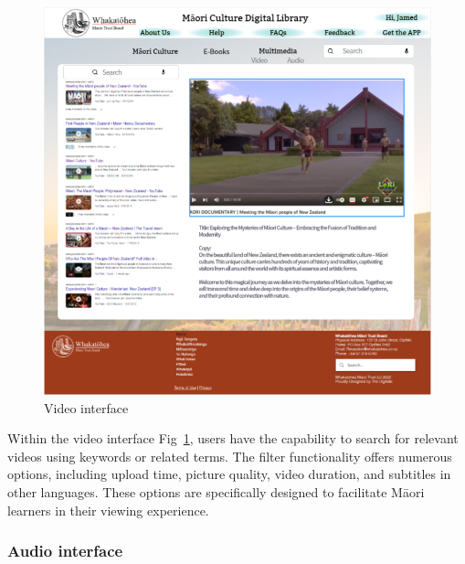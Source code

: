\begin{figure}[htbp]
  \centerline{\includegraphics[width=400pt]{images/3-3-1.png}}
  \caption{Video interface}
  \label{fig3.3.1}
\end{figure}

Within the video interface Fig~\ref{fig3.3.1}, users have the capability to search for relevant videos using keywords or related terms. The filter functionality offers numerous options, including upload time, picture quality, video duration, and subtitles in other languages. These options are specifically designed to facilitate Māori learners in their viewing experience.

\subsubsection{Audio interface}

